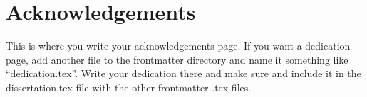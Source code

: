 \chapter*{Acknowledgements}

This is where you write your acknowledgements page. If you want a dedication
page, add another file to the frontmatter directory and name it something
like ``dedication.tex''. Write your dedication there and make sure and include
it in the dissertation.tex file with the other frontmatter .tex files.

\newpage
